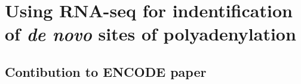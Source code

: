 \documentclass[b5paper]{report}
\begin{document}
\part{Using RNA-seq for indentification of \textit{de novo} sites of
polyadenylation}

\chapter{Contibution to ENCODE paper}



\end{document}

